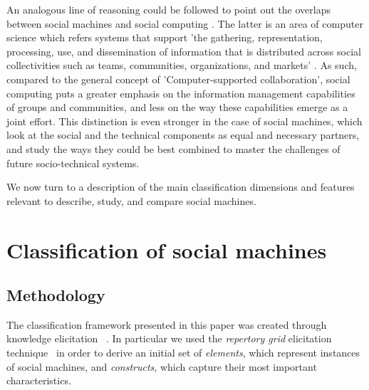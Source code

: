 \documentclass{sig-alternate}
\begin{document}
An analogous line of reasoning could be followed to point out the overlaps between social machines and social computing \cite{parameswaran2007research}. The latter is an area of computer science which refers systems that support 'the gathering, representation, processing, use, and dissemination of information that is distributed across social collectivities such as teams, communities, organizations, and markets' \cite{parameswaran2007research}. As such, compared to the general concept of 'Computer-supported collaboration', social computing puts a greater emphasis on the information management capabilities of groups and communities, and less on the way these capabilities emerge as a joint effort. This distinction is even stronger in the case of social machines, which look at the social and the technical components as equal and necessary partners, and study the ways they could be best combined to master the challenges of future socio-technical systems.

We now turn to a description of the main classification dimensions and features relevant to describe, study, and compare social machines.

\section{Classification of social machines}
\label{sec:framework}

\subsection{Methodology}
\label{sec:methodology}
The classification framework presented in this paper was created through knowledge elicitation ~\cite{knowledgeelicitation}. In particular we used the {\it repertory grid} elicitation
technique~\cite{kelly} in order to derive an initial set of {\it elements}, which represent instances of social machines, and {\it constructs}, which capture their most important characteristics.
\end{document}
